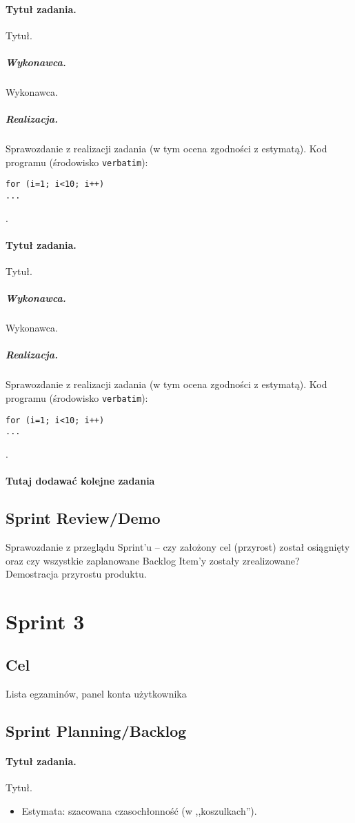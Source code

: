 \documentclass[a4paper]{article}
\begin{document}
\paragraph{Tytuł zadania.} Tytuł.
\subparagraph{Wykonawca.} Wykonawca.
\subparagraph{Realizacja.} Sprawozdanie z realizacji zadania (w tym ocena zgodności z estymatą). Kod programu (środowisko \texttt{verbatim}): \begin{verbatim}
for (i=1; i<10; i++)
...
\end{verbatim}.

\paragraph{Tytuł zadania.} Tytuł.
\subparagraph{Wykonawca.} Wykonawca.
\subparagraph{Realizacja.} Sprawozdanie z realizacji zadania (w tym ocena zgodności z estymatą). Kod programu (środowisko \texttt{verbatim}): \begin{verbatim}
for (i=1; i<10; i++)
...
\end{verbatim}.

\paragraph{Tutaj dodawać kolejne zadania}


\subsection{Sprint Review/Demo}
Sprawozdanie z przeglądu Sprint'u -- czy założony cel (przyrost) został osiągnięty oraz czy wszystkie zaplanowane Backlog Item'y zostały zrealizowane? Demostracja przyrostu produktu.

\section{Sprint 3}

\subsection{Cel}  Lista egzaminów, panel konta użytkownika

\subsection{Sprint Planning/Backlog}

\paragraph{Tytuł zadania.} Tytuł.
\begin{itemize}
\item Estymata: szacowana czasochłonność (w ,,koszulkach'').
\end{itemize}
\end{document}
